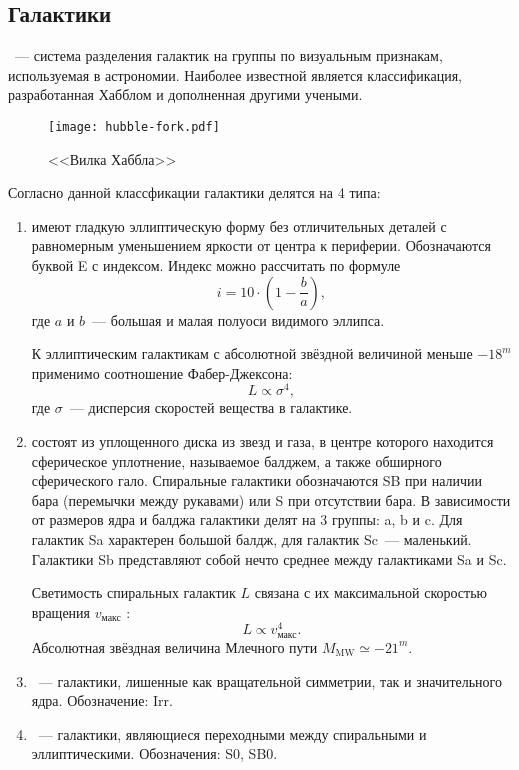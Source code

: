 \subsection{Галактики}
~--- система разделения галактик на группы по визуальным признакам, используемая в астрономии. Наиболее известной является классификация, разработанная Хабблом и дополненная другими учеными. 
	\begin{figure}[h!]
		\centering
		\vspace{-.9pc}
		\texttt{[image: hubble-fork.pdf]}
		\caption{<<Вилка Хаббла>>}
	\end{figure}
	
Согласно данной классфикации галактики делятся на 4 типа:
\begin{enumerate}[itemsep=3pt, label={\arabic*.}, leftmargin=1pc]
	\item{ имеют гладкую эллиптическую форму без отличительных деталей с равномерным уменьшением яркости от центра к периферии. Обозначаются буквой E с индексом. Индекс можно рассчитать по формуле
		\begin{equation}
		i = 10 \cdot \left(1 - \frac{b}{a}\right),
		\end{equation}\nopagebreak
		где $a$ и $b$~--- большая и малая полуоси видимого эллипса. 
		
		К эллиптическим галактикам с абсолютной звёздной величиной меньше $-18^m$ применимо соотношение Фабер-Джексона:
		\begin{equation}
			L \propto \sigma^4,
		\end{equation}
		где $\sigma$~--- дисперсия скоростей вещества в галактике.}
	\item{ состоят из уплощенного диска из звезд и газа, в центре которого находится сферическое уплотнение, называемое балджем, а также обширного сферического гало. Спиральные галактики обозначаются SB при наличии бара (перемычки между рукавами) или S при отсутствии бара. В зависимости от размеров ядра и балджа галактики делят на 3 группы: a, b и c. Для галактик Sa характерен большой балдж, для галактик Sc~--- маленький. Галактики Sb представляют собой нечто среднее между галактиками Sa и Sc.
	
	Светимость спиральных галактик $L$ связана с их максимальной скоростью вращения $v_\text{макс}$ :
	\begin{equation}
		L \propto v_\text{макс}^4.
	\end{equation}
	Абсолютная звёздная величина Млечного пути $M_\text{MW} \simeq -21^m$.}
	\item{~--- галактики, лишенные как вращательной симметрии, так и значительного ядра. Обозначение: Irr.}
	\item{~--- галактики, являющиеся переходными между спиральными и эллиптическими. Обозначения: S0, SB0.}
\end{enumerate}

